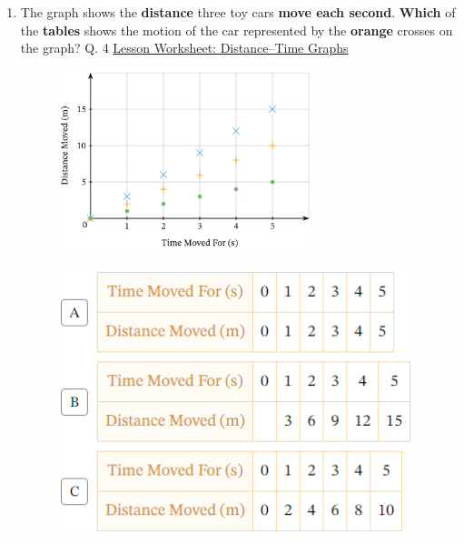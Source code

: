 \documentclass[A4,12pt]{article}
\begin{document}
\begin{enumerate}[label=\bfseries (\arabic*)]
\item The graph shows the \textbf{distance} three toy cars \textbf{move each second}. \textbf{Which} of the \textbf{tables} shows the motion of the car represented by the \textbf{orange} crosses on the graph? \cite{Nagwa} Q. 4 \href{https://www.nagwa.com/en/worksheets/932192593730/}{Lesson Worksheet: Distance–Time Graphs}\\
%
\begin{figure}[H]
    \centering
    \includegraphics[width=0.7\textwidth]{Nagwa_Q4_kin.png}
\end{figure}
%
%
\begin{figure}[H]
    \centering
    \includegraphics{Nagwa_Q4_kin-2.png}
\end{figure}
%


\end{enumerate}
\end{document}
